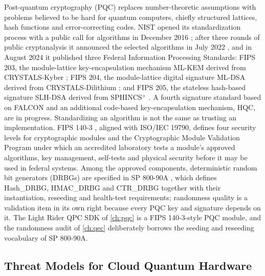 Post-quantum cryptography (PQC) \cite{bernstein2017pqc} replaces number-theoretic assumptions with problems believed to be hard for quantum computers, chiefly structured lattices, hash functions and error-correcting codes. NIST opened its standardization process with a public call for algorithms in December 2016 \cite{nist2016pqccall}; after three rounds of public cryptanalysis it announced the selected algorithms in July 2022 \cite{nist2022ir8413}, and in August 2024 it published three Federal Information Processing Standards: FIPS 203, the module-lattice key-encapsulation mechanism ML-KEM derived from CRYSTALS-Kyber \cite{nist2024fips203}; FIPS 204, the module-lattice digital signature ML-DSA derived from CRYSTALS-Dilithium \cite{nist2024fips204}; and FIPS 205, the stateless hash-based signature SLH-DSA derived from SPHINCS$^{+}$ \cite{nist2024fips205}. A fourth signature standard based on FALCON and an additional code-based key-encapsulation mechanism, HQC, are in progress. Standardizing an algorithm is not the same as trusting an implementation. FIPS 140-3 \cite{nist2019fips1403}, aligned with ISO/IEC 19790, defines four security levels for cryptographic modules and the Cryptographic Module Validation Program under which an accredited laboratory tests a module's approved algorithms, key management, self-tests and physical security before it may be used in federal systems. Among the approved components, deterministic random bit generators (DRBGs) are specified in SP 800-90A \cite{nist2015sp80090a}, which defines Hash\_DRBG, HMAC\_DRBG and CTR\_DRBG together with their instantiation, reseeding and health-test requirements; randomness quality is a validation item in its own right because every PQC key and signature depends on it. The Light Rider QPC SDK of \cref{ch:pqc} \cite{guo2026lightriderqpc} is a FIPS 140-3-style PQC module, and the randomness audit of \cref{ch:qec} \cite{guo2026qecaudit} deliberately borrows the seeding and reseeding vocabulary of SP 800-90A.

\subsection{Threat Models for Cloud Quantum Hardware}

